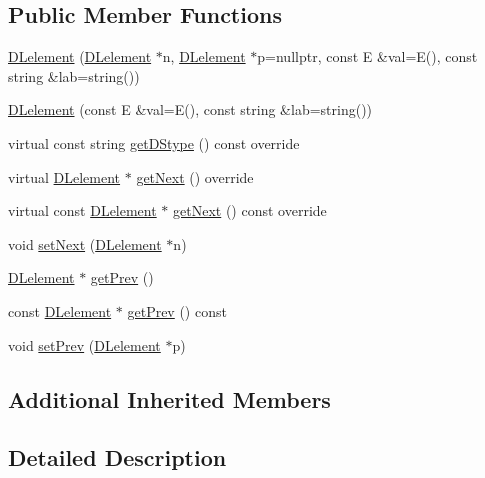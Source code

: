 \subsection*{Public Member Functions}
\begin{DoxyCompactItemize}
\item 
\hyperlink{classbridges_1_1_d_lelement_a846424760c641ba5f496615361d8f79c}{D\+Lelement} (\hyperlink{classbridges_1_1_d_lelement}{D\+Lelement} $\ast$n, \hyperlink{classbridges_1_1_d_lelement}{D\+Lelement} $\ast$p=nullptr, const E \&val=E(), const string \&lab=string())
\item 
\hyperlink{classbridges_1_1_d_lelement_aab0e126bc0b34815f855899b5a8fa75a}{D\+Lelement} (const E \&val=E(), const string \&lab=string())
\item 
virtual const string \hyperlink{classbridges_1_1_d_lelement_a5deee8b106a2f3f7d221152bf244016d}{get\+D\+Stype} () const  override
\item 
virtual \hyperlink{classbridges_1_1_d_lelement}{D\+Lelement} $\ast$ \hyperlink{classbridges_1_1_d_lelement_a0c713707d8c7d0a97fe4194ed6592ede}{get\+Next} () override
\item 
virtual const \hyperlink{classbridges_1_1_d_lelement}{D\+Lelement} $\ast$ \hyperlink{classbridges_1_1_d_lelement_aedf2348136456e0ee116f297f51d7637}{get\+Next} () const  override
\item 
void \hyperlink{classbridges_1_1_d_lelement_aba19c60b1d10c145b1b737f9134f4497}{set\+Next} (\hyperlink{classbridges_1_1_d_lelement}{D\+Lelement} $\ast$n)
\item 
\hyperlink{classbridges_1_1_d_lelement}{D\+Lelement} $\ast$ \hyperlink{classbridges_1_1_d_lelement_a5b0316fb255d022b0dc3065d681fc2a7}{get\+Prev} ()
\item 
const \hyperlink{classbridges_1_1_d_lelement}{D\+Lelement} $\ast$ \hyperlink{classbridges_1_1_d_lelement_a580c05bdafd32a3d6d9d1148b410a7c8}{get\+Prev} () const 
\item 
void \hyperlink{classbridges_1_1_d_lelement_af146e0e10faba6395272d5fc1560f266}{set\+Prev} (\hyperlink{classbridges_1_1_d_lelement}{D\+Lelement} $\ast$p)
\end{DoxyCompactItemize}
\subsection*{Additional Inherited Members}


\subsection{Detailed Description}
